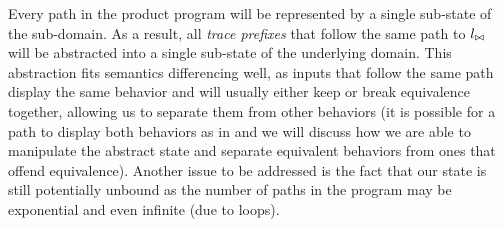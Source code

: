 
Every path in the product program will be represented by a single sub-state of the sub-domain. As a result, all \emph{trace prefixes} that follow the same path to $l_{\bowtie}$ will be abstracted into a single sub-state of the underlying domain. This abstraction fits semantics differencing well, as inputs that follow the same path display the same behavior and will usually either keep or break equivalence together, allowing us to separate them from other behaviors (it is possible for a path to display both behaviors as in  and we will discuss how we are able to manipulate the abstract state and separate equivalent behaviors from ones that offend equivalence). Another issue to be addressed is the fact that our state is still potentially unbound as the number of paths in the program may be exponential and even infinite (due to loops).

